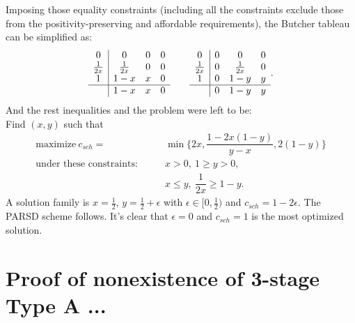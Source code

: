 Imposing those equality constraints (including all the constraints exclude those from the positivity-preserving and affordable requirements), the Butcher tableau can be simplified as:
\begin{equation}
  \begin{array}{c | c c c}
  	     0       & 0            & 0 & 0 \\
  	\frac{1}{2x} & \frac{1}{2x} & 0 & 0 \\
  	     1       & 1-x          & x & 0 \\ \hline
  	             & 1-x          & x & 0
  \end{array}
  \qquad
  \begin{array}{c | c c c}
  	     0       & 0 & 0            & 0 \\
  	\frac{1}{2x} & 0 & \frac{1}{2x} & 0 \\
  	     1       & 0 & 1-y          & y \\ \hline
  	             & 0 & 1-y          & y
  \end{array}.
\end{equation}
And the rest inequalities and the problem were left to be: \\
Find $(x,y)$ such that
\begin{align*}
\text{maximize} ~ c_{sch} = &\min \{ 2x, \dfrac{1-2x(1-y)}{y-x}, 2(1-y)\}\\
 \text{under these constraints:} \qquad & x > 0, ~ 1 \geq y > 0, \\
 & x \leq y, ~\dfrac{1}{2x} \geq 1-y.
\end{align*}
A solution family is $x=\frac{1}{2}$, $y=\frac{1}{2} + \epsilon$ with $\epsilon \in [0, \frac{1}{2})$ and $c_{sch} = 1 - 2\epsilon$.
The PARSD scheme follows.
It's clear that $\epsilon = 0$ and $c_{sch} = 1$ is the most optimized solution.

\section{Proof of nonexistence of 3-stage Type A ...}


